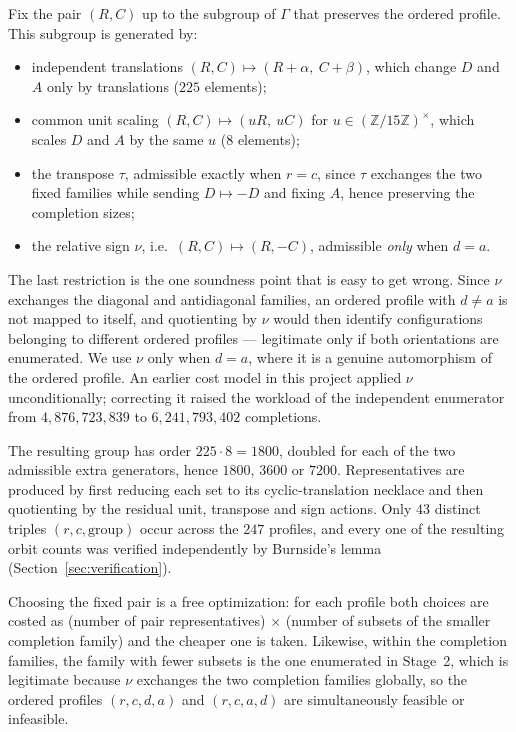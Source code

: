\documentclass[11pt]{amsart}
\theoremstyle{remark}
\newcommand{\Z}{\mathbb{Z}}
\newcommand{\Zn}{\Z/15\Z}
\begin{document}
Fix the pair $(R,C)$ up to the subgroup of $\Gamma$ that preserves the ordered profile. This subgroup is generated by:
\begin{itemize}
\item independent translations $(R,C)\mapsto(R+\alpha,\ C+\beta)$, which change $D$ and $A$ only by translations ($225$ elements);
\item common unit scaling $(R,C)\mapsto(uR,\ uC)$ for $u\in(\Zn)^{\times}$, which scales $D$ and $A$ by the same $u$ ($8$ elements);
\item the transpose $\tau$, admissible exactly when $r=c$, since $\tau$ exchanges the two fixed families while sending $D\mapsto -D$ and fixing $A$, hence preserving the completion sizes;
\item the relative sign $\nu$, i.e.\ $(R,C)\mapsto(R,-C)$, admissible \emph{only} when $d=a$.
\end{itemize}
The last restriction is the one soundness point that is easy to get wrong. Since $\nu$ exchanges the diagonal and antidiagonal families, an ordered profile with $d\ne a$ is not mapped to itself, and quotienting by $\nu$ would then identify configurations belonging to different ordered profiles --- legitimate only if both orientations are enumerated. We use $\nu$ only when $d=a$, where it is a genuine automorphism of the ordered profile. An earlier cost model in this project applied $\nu$ unconditionally; correcting it raised the workload of the independent enumerator from $4{,}876{,}723{,}839$ to $6{,}241{,}793{,}402$ completions.

The resulting group has order $225\cdot 8=1800$, doubled for each of the two admissible extra generators, hence $1800$, $3600$ or $7200$. Representatives are produced by first reducing each set to its cyclic-translation necklace and then quotienting by the residual unit, transpose and sign actions. Only $43$ distinct triples $(r,c,\text{group})$ occur across the $247$ profiles, and every one of the resulting orbit counts was verified independently by Burnside's lemma (Section~\ref{sec:verification}).

Choosing the fixed pair is a free optimization: for each profile both choices are costed as (number of pair representatives) $\times$ (number of subsets of the smaller completion family) and the cheaper one is taken. Likewise, within the completion families, the family with fewer subsets is the one enumerated in Stage~2, which is legitimate because $\nu$ exchanges the two completion families globally, so the ordered profiles $(r,c,d,a)$ and $(r,c,a,d)$ are simultaneously feasible or infeasible.
\end{document}
